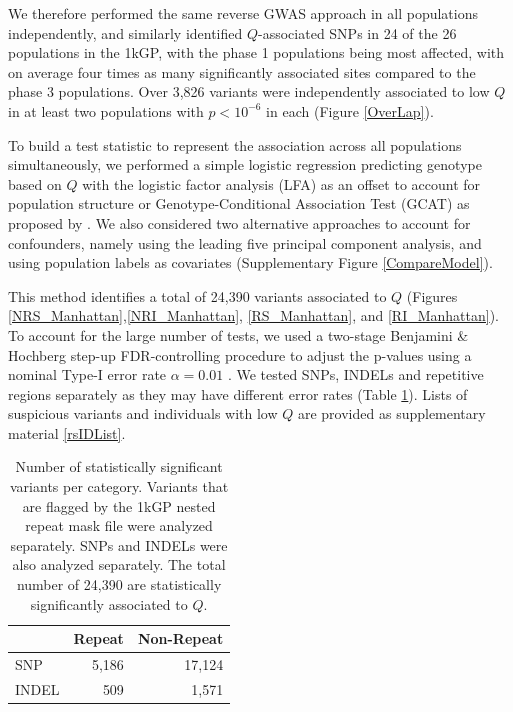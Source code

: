 \documentclass[custompaper]{MBE}%
\begin{document}
We therefore performed the same reverse GWAS approach in all populations independently, and similarly identified $Q$-associated SNPs in 24 of the 26 populations in the 1kGP, with the phase 1 populations being most affected, with on average four times as many significantly associated sites compared to the phase 3 populations.
Over 3,826 variants were independently associated to low $Q$ in at least two populations with $ p < 10^{-6}$ in each (Figure \ref{OverLap}).

To build a test statistic to represent the association across all populations simultaneously, we performed a simple logistic regression predicting genotype based on $Q$ with the logistic factor analysis (LFA) as an offset to account for population structure or Genotype-Conditional Association Test  (GCAT) as proposed by \citep{song2015testing}. 
We also considered two alternative approaches to account for confounders, namely using the leading five  principal component analysis, and using population labels as covariates (Supplementary Figure \ref{CompareModel}). 

This method identifies a total of 24,390 variants associated to $Q$ (Figures \ref{NRS_Manhattan},\ref{NRI_Manhattan}, \ref{RS_Manhattan}, and \ref{RI_Manhattan}). 
To account for the large number of tests, we used a two-stage Benjamini \& Hochberg step-up FDR-controlling procedure to adjust the p-values using a nominal Type-I error rate $\alpha = 0.01$ \citep{Benjamini2006}. 
We tested SNPs, INDELs and repetitive regions separately as they may have different error rates (Table \ref{sigTable}).
Lists of suspicious variants and individuals with low $Q$ are provided as supplementary material \ref{rsIDList}.


\begin{table}
\centering
\begin{tabular}{l  r r}
                      & {Repeat}  & {Non-Repeat}       \\ \hline
{SNP}  & 5,186 & 17,124 \\  
{INDEL} & 509 & 1,571 \\ \hline
\end{tabular}
\caption{Number of statistically significant variants per category. 
Variants that are flagged by the 1kGP nested repeat mask file were analyzed separately. 
SNPs and INDELs were also analyzed separately. 
The total number of 24,390 are statistically significantly associated to $Q$.}
\label{sigTable}
\end{table}
\end{document}
